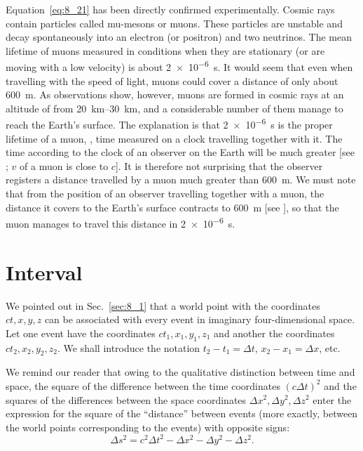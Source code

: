 Equation~\eqref{eq:8_21} has been directly confirmed experimentally. Cosmic rays contain particles called mu-mesons or muons. These particles are unstable and decay spontaneously into an electron (or positron) and two neutrinos. The mean lifetime of muons measured in conditions when they are stationary (or are moving with a low velocity) is about \SI{2e-6}{\second}. It would seem that even when travelling with the speed of light, muons could cover a distance of only about \SI{600}{\metre}. As observations show, however, muons are formed in cosmic rays at an altitude of from \SIrange{20}{30}{\kilo\metre}, and a considerable number of them manage to reach the Earth's surface. The explanation is that \SI{2e-6}{\second} is the proper lifetime of a muon, \ie, time measured on a clock travelling together with it. The time according to the clock of an observer on the Earth will be much greater [see ; $v$ of a muon is close to $c$]. It is therefore not surprising that the observer registers a distance travelled by a muon much greater than \SI{600}{\metre}. We must note that from the position of an observer travelling together with a muon, the distance it covers to the Earth's surface contracts to \SI{600}{\metre} [see ], so that the muon manages to travel this distance in \SI{2e-6}{\second}.

\section{Interval}\label{sec:8_4}

We pointed out in Sec.~\ref{sec:8_1} that a world point with the coordinates $ct, x, y, z$ can be associated with every event in imaginary four-dimensional space. Let one event have the coordinates $ct_1, x_1, y_1, z_1$ and another the coordinates $ct_2, x_2, y_2, z_2$. We shall introduce the notation $t_2-t_1=\Delta t$, $x_2-x_1=\Delta x$, etc.

We remind our reader that owing to the qualitative distinction between time and space, the square of the difference between the time coordinates $(c\Delta t)^2$ and the squares of the differences between the space coordinates $\Delta x^2, \Delta y^2, \Delta z^2$ enter the expression for the square of the ``distance'' between events (more exactly, between the world points corresponding to the events) with opposite signs:
\begin{equation}\label{eq:8_22}
	\Delta s^2 = c^2\Delta t^2 - \Delta x^2 - \Delta y^2 - \Delta z^2.
\end{equation}


